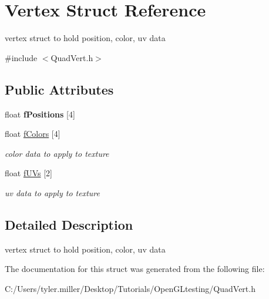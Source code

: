 \hypertarget{struct_vertex}{}\section{Vertex Struct Reference}
\label{struct_vertex}


vertex struct to hold position, color, uv data  




{\ttfamily \#include $<$Quad\+Vert.\+h$>$}

\subsection*{Public Attributes}
\begin{DoxyCompactItemize}
\item 
\hypertarget{struct_vertex_a1eafaa856610861f7e9b8bf82c2bdc81}{}float {\bfseries f\+Positions} \mbox{[}4\mbox{]}\label{struct_vertex_a1eafaa856610861f7e9b8bf82c2bdc81}

\item 
\hypertarget{struct_vertex_a67b78749fdf03752a30f29da0ce13267}{}float \hyperlink{struct_vertex_a67b78749fdf03752a30f29da0ce13267}{f\+Colors} \mbox{[}4\mbox{]}\label{struct_vertex_a67b78749fdf03752a30f29da0ce13267}

\begin{DoxyCompactList}\small\item\em color data to apply to texture \end{DoxyCompactList}\item 
\hypertarget{struct_vertex_acfa03b8678b2c3564fd3742d7da66c89}{}float \hyperlink{struct_vertex_acfa03b8678b2c3564fd3742d7da66c89}{f\+U\+Vs} \mbox{[}2\mbox{]}\label{struct_vertex_acfa03b8678b2c3564fd3742d7da66c89}

\begin{DoxyCompactList}\small\item\em uv data to apply to texture \end{DoxyCompactList}\end{DoxyCompactItemize}


\subsection{Detailed Description}
vertex struct to hold position, color, uv data 

The documentation for this struct was generated from the following file\+:\begin{DoxyCompactItemize}
\item 
C\+:/\+Users/tyler.\+miller/\+Desktop/\+Tutorials/\+Open\+G\+Ltesting/Quad\+Vert.\+h\end{DoxyCompactItemize}
